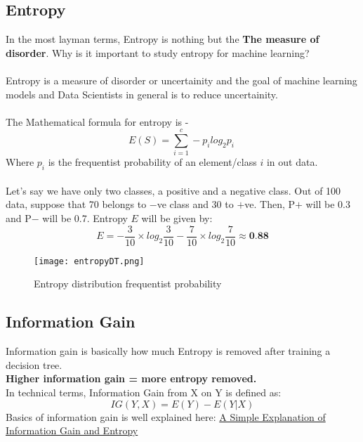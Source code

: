 \subsection*{Entropy}
	In the most layman terms, Entropy is nothing but the \textbf{The measure of disorder}.
	Why is it important to study entropy for machine learning? \\
	\\ Entropy is a measure of disorder or uncertainity and the goal of machine learning models and Data Scientists in general is to reduce uncertainity.\\
	\\ The Mathematical formula for entropy is - 
	\begin{equation}\label {eq:entropy}
		E(S) = \sum_{i=1}^c - p_i log_2 p_i\
	\end{equation}
	Where $p_i$ is the frequentist probability of an element/class $i$ in out data.\\
	\\ Let's say we have only two classes, a positive and a negative class. Out of 100 data, suppose that 70 belongs to $-$ve class and 30 to $+$ve. Then, P$+$ will be 0.3 and P$-$ will be 0.7.
	\vspace{4mm}
	Entropy $E$ will be given by:
	\begin{equation}
		E = -\frac{3}{10} \times log_2{\frac{3}{10}}-\frac{7}{10} \times log_2{\frac{7}{10}} \approx \textbf{0.88}
	\end{equation}
	\begin{figure}[h]
		\centering
		\texttt{[image: entropyDT.png]}
		\caption{Entropy distribution frequentist probability}
	\end{figure}

\subsection*{Information Gain}
	Information gain is basically how much Entropy is removed after training a decision tree.\\
	\textbf{Higher information gain = more entropy removed.}\\
	In technical terms, Information Gain from X on Y is defined as:
	\begin{equation}\label{eq:inforamtion gain}
		IG(Y,X) = E(Y) - E(Y|X)
	\end{equation}
	Basics of information gain is well explained here: \href{https://victorzhou.com/blog/information-gain/}{A Simple Explanation of Information Gain and Entropy}

